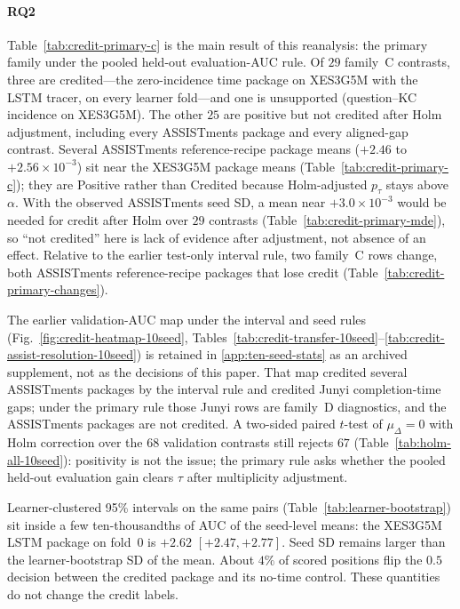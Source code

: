 \documentclass[review,12pt]{elsarticle}
\begin{document}
\paragraph{RQ2}
Table~\ref{tab:credit-primary-c} is the main result of this reanalysis:
the primary family under the pooled held-out evaluation-AUC rule. Of $29$ family~C
contrasts, three are credited---the zero-incidence time package on
XES3G5M with the LSTM tracer, on every learner fold---and one is
unsupported (question--KC incidence on XES3G5M). The other $25$ are
positive but not credited after Holm adjustment, including every
ASSISTments package and every aligned-gap contrast. Several ASSISTments
reference-recipe package means ($+2.46$ to $+2.56\times 10^{-3}$) sit
near the XES3G5M package means (Table~\ref{tab:credit-primary-c}); they
are Positive rather than Credited because Holm-adjusted $p_\tau$ stays
above $\alpha$. With the observed ASSISTments seed SD, a mean near
$+3.0\times 10^{-3}$ would be needed for credit after Holm over $29$
contrasts (Table~\ref{tab:credit-primary-mde}), so ``not credited'' here
is lack of evidence after adjustment, not absence of an effect.
Relative to the earlier test-only interval rule, two family~C rows
change, both ASSISTments reference-recipe packages that lose credit
(Table~\ref{tab:credit-primary-changes}).

The earlier validation-AUC map under the interval and seed rules
(Fig.~\ref{fig:credit-heatmap-10seed},
Tables~\ref{tab:credit-transfer-10seed}--\ref{tab:credit-assist-resolution-10seed})
is retained in \ref{app:ten-seed-stats} as an archived supplement, not
as the decisions of this paper. That map credited several ASSISTments
packages by the interval rule and credited Junyi completion-time gaps;
under the primary rule those Junyi rows are family~D diagnostics, and
the ASSISTments packages are not credited. A two-sided paired $t$-test
of $\mu_\Delta{=}0$ with Holm correction over the $68$ validation
contrasts still rejects $67$ (Table~\ref{tab:holm-all-10seed}):
positivity is not the issue; the primary rule asks whether the pooled
held-out evaluation gain clears $\tau$ after multiplicity adjustment.






Learner-clustered 95\% intervals on the same pairs
(Table~\ref{tab:learner-bootstrap}) sit inside a few ten-thousandths of
AUC of the seed-level means: the XES3G5M LSTM package on fold~0 is
$+2.62$ $[+2.47,+2.77]$. Seed SD remains larger than the learner-bootstrap
SD of the mean. About $4\%$ of scored positions flip the $0.5$ decision
between the credited package and its no-time control. These quantities
do not change the credit labels.
\end{document}
